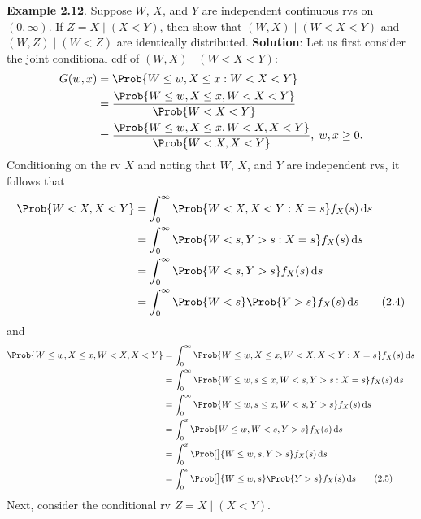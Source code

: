 \begin{Example}
    \textbf{Example 2.12}. Suppose $ W $, $ X $, and $ Y $ are independent continuous rvs on $ (0,\infty) $. If
    $ Z=X\mid(X<Y) $, then show that $ (W,X)\mid(W<X<Y) $ and $ (W,Z)\mid(W<Z) $ are identically distributed.
    \tcblower{}
    \textbf{Solution}: Let us first consider the joint conditional cdf of $ (W,X)\mid(W<X<Y) $:
    \begin{align*}
        G(w,x) & =\Prob{W\le w,X\le x\given W<X<Y}                                   \\
               & =\frac{\Prob{W\le w,X\le x, W<X<Y}}{\Prob{W<X<Y}}                   \\
               & =\frac{\Prob{W\le w,X\le x, W<X, X<Y}}{\Prob{W<X,X<Y}},\; w,x\ge 0.
    \end{align*}
    Conditioning on the rv $ X $ and noting that $ W $, $ X $, and $ Y $ are independent rvs, it follows that
    \begin{align*}
        \Prob{W<X,X<Y}
         & =\int_{0}^{\infty}\Prob{W<X,X<Y\given X=s}f_X(s)\odif{s}                        \\
         & =\int_{0}^{\infty}\Prob{W<s,Y>s\given X=s}f_X(s)\odif{s}                        \\
         & =\int_{0}^{\infty}\Prob{W<s,Y>s}f_X(s)\odif{s}                                  \\
         & =\int_{0}^{\infty}\Prob{W<s}\Prob{Y>s}f_X(s)\odif{s}     \label{eq2.4}\tag{2.4}
    \end{align*}
    and
    \begin{align*}
        \Prob{W\le w,X\le x, W<X, X<Y}
         & =\int_{0}^{\infty}\Prob{W\le w,X\le x,W<X,X<Y\given X=s}f_X(s)\odif{s}                 \\
         & =\int_{0}^{\infty}\Prob{W\le w,s\le x,W<s,Y>s\given X=s}f_X(s)\odif{s}                 \\
         & =\int_{0}^{\infty}\Prob{W\le w,s\le x,W<s,Y>s}f_X(s)\odif{s}                           \\
         & =\int_{0}^{x}\Prob{W\le w,W<s,Y>s}f_X(s)\odif{s}                                       \\
         & =\int_{0}^{x}\Prob[\big]{W\le \min{w,s},Y>s}f_X(s)\odif{s}                             \\
         & =\int_{0}^{x}\Prob[\big]{W\le \min{w,s}}\Prob{Y>s}f_X(s)\odif{s}\label{eq2.5}\tag{2.5}
    \end{align*}
    Next, consider the conditional rv $ Z=X\mid(X<Y) $.

\end{Example}
